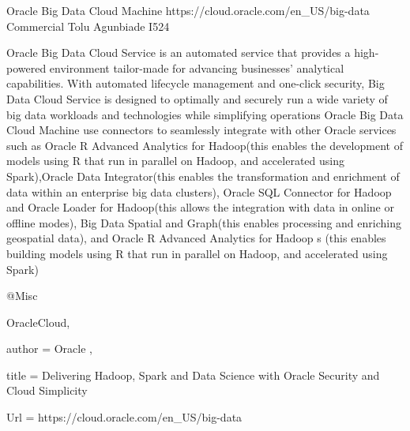 Oracle Big Data Cloud Machine
https://cloud.oracle.com/en_US/big-data
Commercial
Tolu Agunbiade
I524

Oracle Big Data Cloud Service is an automated service that provides a high-powered environment tailor-made for advancing businesses’ analytical capabilities. With automated lifecycle management and one-click security, Big Data Cloud Service is designed to optimally and securely run a wide variety of big data workloads and technologies while simplifying operations\cite{OracleCloud}
Oracle Big Data Cloud Machine use connectors to seamlessly integrate with other Oracle services such as Oracle R Advanced Analytics for Hadoop(this enables the development of  models using R that run in parallel on Hadoop, and accelerated using Spark),Oracle Data Integrator(this enables the transformation and enrichment of data within an enterprise big data clusters), Oracle SQL Connector for Hadoop and Oracle Loader for Hadoop(this allows the integration with data in online or offline modes), Big Data Spatial and Graph(this enables processing and enriching geospatial data), and Oracle R Advanced Analytics for Hadoop
s (this enables building models using R that run in parallel on Hadoop, and accelerated using Spark)\cite{OracleCloud}

@Misc{OracleCloud,

  author = { Oracle },

  title        = {Delivering Hadoop, Spark and Data Science with Oracle Security and Cloud Simplicity}

  Url = {https://cloud.oracle.com/en_US/big-data }

}


